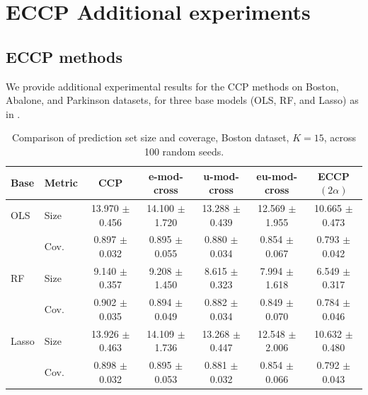\documentclass{article}
\theoremstyle{plain}
\theoremstyle{definition}
\theoremstyle{remark}
\begin{document}
\section{ECCP Additional experiments}
\label{app:additional_experiments}
\subsection{ECCP methods}
We provide additional experimental results for the CCP methods on Boston, Abalone, and Parkinson
\citep{tsanas2009parkinsons} datasets,  
for three base models (OLS, RF, and Lasso) as in \citep{gasparinimproving}. 

\begin{table}[H]
\centering
\caption{Comparison of prediction set size and coverage, Boston dataset, $K=15$, across 100 random seeds.}
\begin{tabular}{llccccc}
\toprule
Base & Metric & CCP & e-mod-cross & u-mod-cross & eu-mod-cross & ECCP$(2\alpha)$ \\
\midrule
OLS & Size & 13.970 $\pm$ 0.456 & 14.100 $\pm$ 1.720 & 13.288 $\pm$ 0.439 & 12.569 $\pm$ 1.955 & 10.665 $\pm$ 0.473 \\
 & Cov. & 0.897 $\pm$ 0.032 & 0.895 $\pm$ 0.055 & 0.880 $\pm$ 0.034 & 0.854 $\pm$ 0.067 & 0.793 $\pm$ 0.042 \\
\midrule
RF & Size & 9.140 $\pm$ 0.357 & 9.208 $\pm$ 1.450 & 8.615 $\pm$ 0.323 & 7.994 $\pm$ 1.618 & 6.549 $\pm$ 0.317 \\
 & Cov. & 0.902 $\pm$ 0.035 & 0.894 $\pm$ 0.049 & 0.882 $\pm$ 0.034 & 0.849 $\pm$ 0.070 & 0.784 $\pm$ 0.046 \\
\midrule
Lasso & Size & 13.926 $\pm$ 0.463 & 14.109 $\pm$ 1.736 & 13.268 $\pm$ 0.447 & 12.548 $\pm$ 2.006 & 10.632 $\pm$ 0.480 \\
 & Cov. & 0.898 $\pm$ 0.032 & 0.895 $\pm$ 0.053 & 0.881 $\pm$ 0.032 & 0.854 $\pm$ 0.066 & 0.792 $\pm$ 0.043 \\
\bottomrule
\end{tabular}
\end{table}
\end{document}
